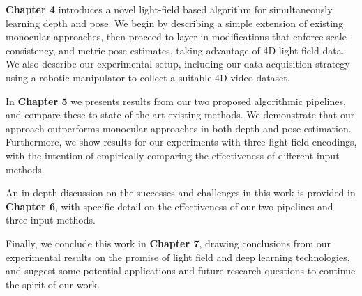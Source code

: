 \textbf{Chapter 4} introduces a novel light-field based algorithm for simultaneously learning depth and pose. We begin by describing a simple extension of existing monocular approaches, then proceed to layer-in modifications that enforce scale-consistency, and metric pose estimates, taking advantage of 4D light field data. We also describe our experimental setup, including our data acquisition strategy using a robotic manipulator to collect a suitable 4D video dataset. 

In \textbf{Chapter 5} we presents results from our two proposed algorithmic pipelines, and compare these to state-of-the-art existing methods. We demonstrate that our approach outperforms monocular approaches in both depth and pose estimation. Furthermore, we show results for our experiments with three light field encodings, with the intention of empirically comparing the effectiveness of different input methods.

An in-depth discussion on the successes and challenges in this work is provided in \textbf{Chapter 6}, with specific detail on the effectiveness of our two pipelines and three input methods. 

Finally, we conclude this work in \textbf{Chapter 7}, drawing conclusions from our experimental results on the promise of light field and deep learning technologies, and suggest some potential applications and future research questions to continue the spirit of our work. 

